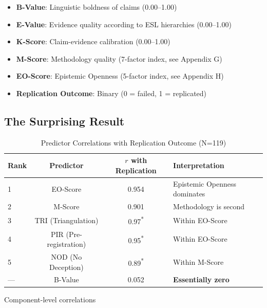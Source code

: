\documentclass[11pt,a4paper]{article}
\begin{document}
\begin{itemize}
    \item \textbf{B-Value}: Linguistic boldness of claims (0.00--1.00)
    \item \textbf{E-Value}: Evidence quality according to ESL hierarchies (0.00--1.00)
    \item \textbf{K-Score}: Claim-evidence calibration (0.00--1.00)
    \item \textbf{M-Score}: Methodology quality (7-factor index, see Appendix G)
    \item \textbf{EO-Score}: Epistemic Openness (5-factor index, see Appendix H)
    \item \textbf{Replication Outcome}: Binary (0 = failed, 1 = replicated)
\end{itemize}

\subsection{The Surprising Result}

\begin{table}[h]
\centering
\caption{Predictor Correlations with Replication Outcome (N=119)}
\label{tab:predictor-ranking}
\begin{tabular}{lccl}
\toprule
\textbf{Rank} & \textbf{Predictor} & \textbf{$r$ with Replication} & \textbf{Interpretation} \\
\midrule
1 & EO-Score & 0.954 & Epistemic Openness dominates \\
2 & M-Score & 0.901 & Methodology is second \\
3 & TRI (Triangulation) & 0.97\textsuperscript{*} & Within EO-Score \\
4 & PIR (Pre-registration) & 0.95\textsuperscript{*} & Within EO-Score \\
5 & NOD (No Deception) & 0.89\textsuperscript{*} & Within M-Score \\
\midrule
--- & B-Value & 0.052 & \textcolor{eslred}{\textbf{Essentially zero}} \\
\bottomrule
\end{tabular}
\begin{tablenotes}
\small
\item[\textsuperscript{*}] Component-level correlations
\end{tablenotes}
\end{table}
\end{document}

